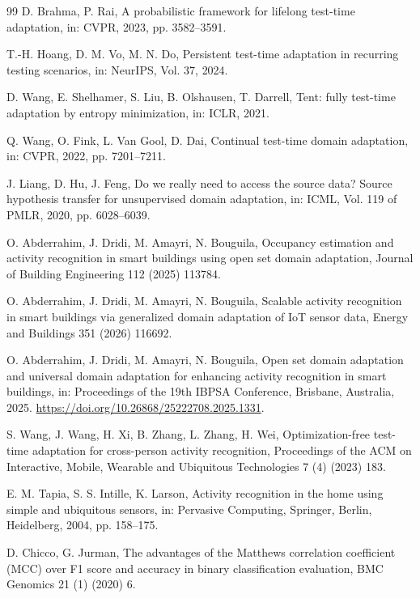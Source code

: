 \documentclass[a4paper,fleqn]{cas-dc}
\begin{document}
\begin{thebibliography}{99}
 D. Brahma, P. Rai, A probabilistic framework for lifelong test-time
adaptation, in: CVPR, 2023, pp. 3582--3591.

 T.-H. Hoang, D. M. Vo, M. N. Do, Persistent test-time adaptation in
recurring testing scenarios, in: NeurIPS, Vol. 37, 2024.

 D. Wang, E. Shelhamer, S. Liu, B. Olshausen, T. Darrell, Tent: fully
test-time adaptation by entropy minimization, in: ICLR, 2021.

 Q. Wang, O. Fink, L. Van Gool, D. Dai, Continual test-time domain
adaptation, in: CVPR, 2022, pp. 7201--7211.

 J. Liang, D. Hu, J. Feng, Do we really need to access the source data?
Source hypothesis transfer for unsupervised domain adaptation, in: ICML, Vol. 119 of PMLR,
2020, pp. 6028--6039.

 O. Abderrahim, J. Dridi, M. Amayri, N. Bouguila, Occupancy
estimation and activity recognition in smart buildings using open set domain adaptation,
Journal of Building Engineering 112 (2025) 113784.

 O. Abderrahim, J. Dridi, M. Amayri, N. Bouguila, Scalable activity
recognition in smart buildings via generalized domain adaptation of IoT sensor data, Energy
and Buildings 351 (2026) 116692.

 O. Abderrahim, J. Dridi, M. Amayri, N. Bouguila, Open set domain
adaptation and universal domain adaptation for enhancing activity recognition in smart
buildings, in: Proceedings of the 19th IBPSA Conference, Brisbane, Australia, 2025.
\url{https://doi.org/10.26868/25222708.2025.1331}.

 S. Wang, J. Wang, H. Xi, B. Zhang, L. Zhang, H. Wei, Optimization-free
test-time adaptation for cross-person activity recognition, Proceedings of the ACM on
Interactive, Mobile, Wearable and Ubiquitous Technologies 7 (4) (2023) 183.

 E. M. Tapia, S. S. Intille, K. Larson, Activity recognition in the
home using simple and ubiquitous sensors, in: Pervasive Computing, Springer, Berlin,
Heidelberg, 2004, pp. 158--175.

 D. Chicco, G. Jurman, The advantages of the Matthews correlation
coefficient (MCC) over F1 score and accuracy in binary classification evaluation, BMC
Genomics 21 (1) (2020) 6.

\end{thebibliography}
\end{document}
